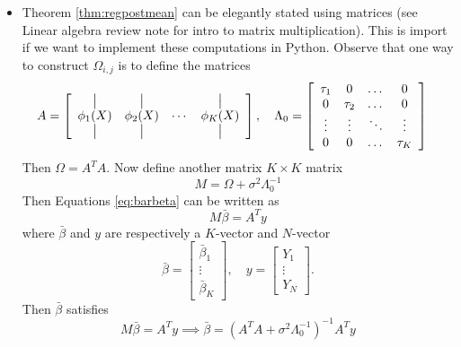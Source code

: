 \begin{itemize}
\item Theorem \ref{thm:regpostmean} can be elegantly stated using matrices (see Linear algebra review note for intro to matrix multiplication).  This is import if we want to implement these computations in Python. Observe that one way to construct $\Omega_{i,j}$ is to define the matrices
\begin{align*}
A &= \left[ 
\begin{array}{cccc}
\,\big|\, & \,\big|\,& & \,\big|\,\\
\phi_1(X) & \phi_2(X) & \cdots & \phi_K(X) \\
\,\big|\, & \,\big|\,& & \,\big|\,
\end{array}
\right],\quad 
\Lambda_0 = \left[
\begin{array}{cccc}
\tau_1 & 0 & \dots & 0 \\
0 & \tau_2 & \dots & 0 \\
\vdots & \vdots & \ddots & \vdots \\
0 & 0 & \dots & \tau_K \\
\end{array}
\right]
\end{align*}
Then $\Omega = A^TA$. 
Now define another matrix $K\times K$ matrix 
\begin{equation*}
M = \Omega + \sigma^2\Lambda_0^{-1}
\end{equation*}
Then Equations \ref{eq:barbeta} can be written as 
\begin{equation*}
M \bar{\beta} = A^Ty
\end{equation*}
where $\bar{\beta}$ and $y$ are respectively a $K$-vector and $N$-vector
\begin{equation*}
\bar{\beta} = \left[\begin{array}{c} \bar{\beta}_1\\ 
\vdots\\
\bar{\beta}_K \end{array}\right],\quad y = \left[\begin{array}{c}Y_1\\ 
\vdots\\
Y_N \end{array}\right]. 
\end{equation*}
Then $\bar{\beta}$ satisfies  
\begin{equation*}
M\bar{\beta} = A^Ty  \implies \bar{\beta} =  \left( A^TA+ \sigma^2\Lambda_0^{-1}\right)^{-1}A^Ty
\end{equation*}



\begin{example}\label{ex:regpostmean}


\end{example}
\end{itemize}
